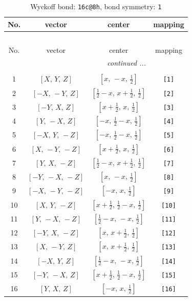 \documentclass[fleqn,8pt]{jsarticle}
\begin{document}
\begin{longtable}{cccc}
\caption{Wyckoff bond: {\tt 16c@8h}, bond symmetry: {\tt 1}}
 \\
 \hline \hline
No. & vector & center & mapping \\ \hline \endfirsthead

\multicolumn{3}{l}{\tablename\ \thetable{}} \\
 \hline \hline
No. & vector & center & mapping \\ \hline \endhead

 \hline \hline
\multicolumn{3}{r}{\footnotesize\it continued ...} \\ \endfoot

 \hline \hline
\multicolumn{3}{r}{} \\ \endlastfoot

1 & $\left[ X,\, Y,\, Z \right]$ & $\left[ x,\, - x,\, \frac{1}{2} \right]$ & {\tt [1]} \\ \hline
2 & $\left[ - X,\, - Y,\, Z \right]$ & $\left[ \frac{1}{2} - x,\, x + \frac{1}{2},\, \frac{1}{2} \right]$ & {\tt [2]} \\ \hline
3 & $\left[ - Y,\, X,\, Z \right]$ & $\left[ x + \frac{1}{2},\, x,\, \frac{1}{2} \right]$ & {\tt [3]} \\ \hline
4 & $\left[ Y,\, - X,\, Z \right]$ & $\left[ - x,\, \frac{1}{2} - x,\, \frac{1}{2} \right]$ & {\tt [4]} \\ \hline
5 & $\left[ - X,\, Y,\, - Z \right]$ & $\left[ - x,\, \frac{1}{2} - x,\, \frac{1}{2} \right]$ & {\tt [5]} \\ \hline
6 & $\left[ X,\, - Y,\, - Z \right]$ & $\left[ x + \frac{1}{2},\, x,\, \frac{1}{2} \right]$ & {\tt [6]} \\ \hline
7 & $\left[ Y,\, X,\, - Z \right]$ & $\left[ \frac{1}{2} - x,\, x + \frac{1}{2},\, \frac{1}{2} \right]$ & {\tt [7]} \\ \hline
8 & $\left[ - Y,\, - X,\, - Z \right]$ & $\left[ x,\, - x,\, \frac{1}{2} \right]$ & {\tt [8]} \\ \hline
9 & $\left[ - X,\, - Y,\, - Z \right]$ & $\left[ - x,\, x,\, \frac{1}{2} \right]$ & {\tt [9]} \\ \hline
10 & $\left[ X,\, Y,\, - Z \right]$ & $\left[ x + \frac{1}{2},\, \frac{1}{2} - x,\, \frac{1}{2} \right]$ & {\tt [10]} \\ \hline
11 & $\left[ Y,\, - X,\, - Z \right]$ & $\left[ \frac{1}{2} - x,\, - x,\, \frac{1}{2} \right]$ & {\tt [11]} \\ \hline
12 & $\left[ - Y,\, X,\, - Z \right]$ & $\left[ x,\, x + \frac{1}{2},\, \frac{1}{2} \right]$ & {\tt [12]} \\ \hline
13 & $\left[ X,\, - Y,\, Z \right]$ & $\left[ x,\, x + \frac{1}{2},\, \frac{1}{2} \right]$ & {\tt [13]} \\ \hline
14 & $\left[ - X,\, Y,\, Z \right]$ & $\left[ \frac{1}{2} - x,\, - x,\, \frac{1}{2} \right]$ & {\tt [14]} \\ \hline
15 & $\left[ - Y,\, - X,\, Z \right]$ & $\left[ x + \frac{1}{2},\, \frac{1}{2} - x,\, \frac{1}{2} \right]$ & {\tt [15]} \\ \hline
16 & $\left[ Y,\, X,\, Z \right]$ & $\left[ - x,\, x,\, \frac{1}{2} \right]$ & {\tt [16]} \\
\end{longtable}
\end{document}
